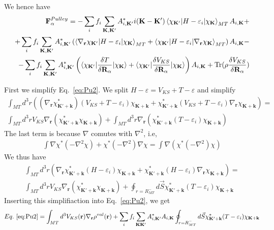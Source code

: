 \documentclass[aps,prb,floatfix,epsfig,singlecolumn,showpacs,preprintnumbers]{revtex4}
\newcommand{\vR}{{\mathbf{R}}}
\newcommand{\vF}{{\mathbf{F}}}
\renewcommand{\vr}{{\mathbf{r}}}
\newcommand{\vk}{{\mathbf{k}}}
\newcommand{\vK}{{\mathbf{K}}}
\newcommand{\Tr}{\mathrm{Tr}}
\begin{document}
We hence have
\begin{eqnarray}
\vF^{Pulley}_\alpha = 
-\sum_i f_i \sum_{\vK,\vK'} A_{i,\vK'}^* 
i(\vK-\vK')\braket{ \chi_{\vK'}  |H-\varepsilon_i|\chi_{\vK}}_{MT}A_{i,\vK}+
\label{eq:Pu1}\\
+\sum_i f_i \sum_{\vK,\vK'} A_{i,\vK'}^* \left(
\braket{\nabla_\vr \chi_{\vK'}  |H-\varepsilon_i|\chi_{\vK}}_{MT}
+\braket{\chi_{\vK'}|H-\varepsilon_i|\nabla_\vr\chi_{\vK}}_{MT}
\right)A_{i,\vK} -
\label{eq:Pu2}\\
-\sum_i f_i \sum_{\vK,\vK'} A_{i,\vK'}^* \left(
%
\braket{\chi_{\vK'}|\frac{\delta T}{\delta\vR_\alpha} |\chi_{\vK}} +
\braket{\chi_{\vK'}|\frac{\delta V_{KS}}{\delta\vR_\alpha} |\chi_{\vK}}\right)A_{i,\vK}
%
+\Tr(\rho \frac{\delta V_{KS}}{\delta\vR_\alpha})
\label{eq:Pu3}
\end{eqnarray}


First we simplify Eq.~\ref{eq:Pu2}. We split $H-\varepsilon=V_{KS}+T-\varepsilon$ and simplify
\begin{eqnarray}
\int_{MT} d^3r\left(  (\nabla_\vr\chi^*_{\vK'+\vk}) (V_{KS}+T-\varepsilon_i)\chi_{\vK+\vk}+
\chi^*_{\vK'+\vk}(V_{KS}+T-\varepsilon_i)\nabla_\vr\chi_{\vK+\vk}\right)=\\
\int_{MT} d^3r V_{KS} \nabla_\vr \left( \chi^*_{\vK'+\vk} \chi_{\vK+\vk}  \right)+
\int_{MT} d^3r \nabla_\vr \left( \chi^*_{\vK'+\vk} (T-\varepsilon_i)\chi_{\vK+\vk}\right)
\end{eqnarray}
The last term is because $\nabla$ comutes with $\nabla^2$, i.e,
\begin{eqnarray}
\int \nabla\chi^* (-\nabla^2\chi)+\chi^*(-\nabla^2)\nabla\chi=\int \nabla(\chi^*(-\nabla^2)\chi)
\end{eqnarray}
We thus have
\begin{eqnarray}
\int_{MT} d^3r\left(  \nabla_\vr\chi^*_{\vK'+\vk} (H-\varepsilon_i)\chi_{\vK+\vk}+
\chi^*_{\vK'+\vk}(H-\varepsilon_i)\nabla_\vr\chi_{\vK+\vk}\right)=\\
\int_{MT} d^3r V_{KS} \nabla_\vr \left( \chi^*_{\vK'+\vk} \chi_{\vK+\vk}  \right)+
\oint_{r=R_{MT}^-} d\vec{S}  \chi^*_{\vK'+\vk} (T-\varepsilon_i)\chi_{\vK+\vk}
\end{eqnarray}
Inserting this simplifiaction into Eq.~\ref{eq:Pu2}, we get
\begin{eqnarray}
Eq.~\ref{eq:Pu2}=\int_{MT} d^3 V_{KS}(\vr) \nabla_\vr \rho^{val}(\vr) + 
\sum_i  f_i \sum_{\vK\vK'}A^*_{i,\vK'}A_{i,\vK} \oint_{r=R_{MT}^-} d\vec{S}  \chi^*_{\vK'+\vk} (T-\varepsilon_i)\chi_{\vK+\vk}
\label{eq:Pu2n}
\end{eqnarray}
\end{document}
